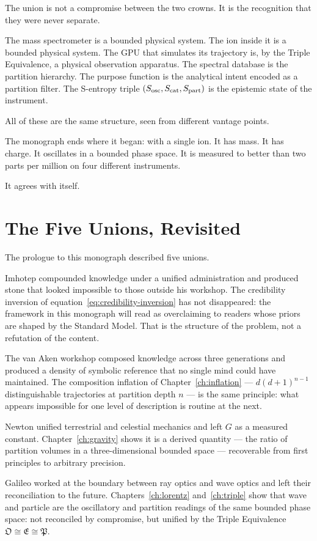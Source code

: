 The union is not a compromise between the two crowns.
It is the recognition that they were never separate.

The mass spectrometer is a bounded physical system.
The ion inside it is a bounded physical system.
The GPU that simulates its trajectory is, by the Triple Equivalence,
a physical observation apparatus.
The spectral database is the partition hierarchy.
The purpose function is the analytical intent encoded as a partition filter.
The S-entropy triple $(S_{\mathrm{osc}}, S_{\mathrm{cat}}, S_{\mathrm{part}})$ is the epistemic state of the
instrument.

All of these are the same structure, seen from different vantage points.

The monograph ends where it began: with a single ion.
It has mass.
It has charge.
It oscillates in a bounded phase space.
It is measured to better than two parts per million on four different instruments.

It agrees with itself.

\section{The Five Unions, Revisited}
\label{sec:ch26-prologue-echo}

The prologue to this monograph described five unions.

Imhotep compounded knowledge under a unified administration and produced
stone that looked impossible to those outside his workshop.
The credibility inversion of equation~\eqref{eq:credibility-inversion}
has not disappeared: the framework in this monograph will read as
overclaiming to readers whose priors are shaped by the Standard Model.
That is the structure of the problem, not a refutation of the content.

The van Aken workshop composed knowledge across three generations and
produced a density of symbolic reference that no single mind could have
maintained.
The composition inflation of Chapter~\ref{ch:inflation} --- $d(d+1)^{n-1}$
distinguishable trajectories at partition depth $n$ --- is the same
principle: what appears impossible for one level of description is routine
at the next.

Newton unified terrestrial and celestial mechanics and left $G$ as a
measured constant.
Chapter~\ref{ch:gravity} shows it is a derived quantity --- the ratio of
partition volumes in a three-dimensional bounded space --- recoverable
from first principles to arbitrary precision.

Galileo worked at the boundary between ray optics and wave optics and
left their reconciliation to the future.
Chapters~\ref{ch:lorentz} and~\ref{ch:triple} show that wave and particle
are the oscillatory and partition readings of the same bounded phase space:
not reconciled by compromise, but unified by the Triple Equivalence
$\mathfrak{O} \cong \mathfrak{E} \cong \mathfrak{P}$.

